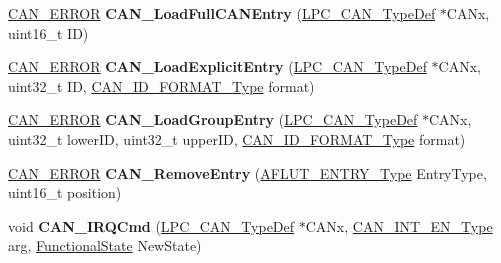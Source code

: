 \begin{DoxyCompactItemize}
\item 
\hypertarget{group___c_a_n___public___functions_ga422879f8fdbdff54c6390113b9240ee1}{\hyperlink{group___c_a_n___public___types_ga1d9859e6b360c9448574f86ea199a112}{\-C\-A\-N\-\_\-\-E\-R\-R\-O\-R} {\bfseries \-C\-A\-N\-\_\-\-Load\-Full\-C\-A\-N\-Entry} (\hyperlink{struct_l_p_c___c_a_n___type_def}{\-L\-P\-C\-\_\-\-C\-A\-N\-\_\-\-Type\-Def} $\ast$\-C\-A\-Nx, uint16\-\_\-t \-I\-D)}\label{group___c_a_n___public___functions_ga422879f8fdbdff54c6390113b9240ee1}

\item 
\hypertarget{group___c_a_n___public___functions_ga28d5776e8f957ae870f2d931d8ca555a}{\hyperlink{group___c_a_n___public___types_ga1d9859e6b360c9448574f86ea199a112}{\-C\-A\-N\-\_\-\-E\-R\-R\-O\-R} {\bfseries \-C\-A\-N\-\_\-\-Load\-Explicit\-Entry} (\hyperlink{struct_l_p_c___c_a_n___type_def}{\-L\-P\-C\-\_\-\-C\-A\-N\-\_\-\-Type\-Def} $\ast$\-C\-A\-Nx, uint32\-\_\-t \-I\-D, \hyperlink{group___c_a_n___public___types_gab5c597672ab7b26c153bcaeda4828e37}{\-C\-A\-N\-\_\-\-I\-D\-\_\-\-F\-O\-R\-M\-A\-T\-\_\-\-Type} format)}\label{group___c_a_n___public___functions_ga28d5776e8f957ae870f2d931d8ca555a}

\item 
\hypertarget{group___c_a_n___public___functions_ga57300f66dcb77df497d66f09be208530}{\hyperlink{group___c_a_n___public___types_ga1d9859e6b360c9448574f86ea199a112}{\-C\-A\-N\-\_\-\-E\-R\-R\-O\-R} {\bfseries \-C\-A\-N\-\_\-\-Load\-Group\-Entry} (\hyperlink{struct_l_p_c___c_a_n___type_def}{\-L\-P\-C\-\_\-\-C\-A\-N\-\_\-\-Type\-Def} $\ast$\-C\-A\-Nx, uint32\-\_\-t lower\-I\-D, uint32\-\_\-t upper\-I\-D, \hyperlink{group___c_a_n___public___types_gab5c597672ab7b26c153bcaeda4828e37}{\-C\-A\-N\-\_\-\-I\-D\-\_\-\-F\-O\-R\-M\-A\-T\-\_\-\-Type} format)}\label{group___c_a_n___public___functions_ga57300f66dcb77df497d66f09be208530}

\item 
\hypertarget{group___c_a_n___public___functions_gaef02b93137c82e7123eb6a7324fff611}{\hyperlink{group___c_a_n___public___types_ga1d9859e6b360c9448574f86ea199a112}{\-C\-A\-N\-\_\-\-E\-R\-R\-O\-R} {\bfseries \-C\-A\-N\-\_\-\-Remove\-Entry} (\hyperlink{group___c_a_n___public___types_gadf681942f2c313b94d483bf0f31f7a55}{\-A\-F\-L\-U\-T\-\_\-\-E\-N\-T\-R\-Y\-\_\-\-Type} \-Entry\-Type, uint16\-\_\-t position)}\label{group___c_a_n___public___functions_gaef02b93137c82e7123eb6a7324fff611}

\item 
\hypertarget{group___c_a_n___public___functions_ga0d0e0f7d8ea71a138fb100f2efdcaf1e}{void {\bfseries \-C\-A\-N\-\_\-\-I\-R\-Q\-Cmd} (\hyperlink{struct_l_p_c___c_a_n___type_def}{\-L\-P\-C\-\_\-\-C\-A\-N\-\_\-\-Type\-Def} $\ast$\-C\-A\-Nx, \hyperlink{group___c_a_n___public___types_gac1a14bd07dce4fe9df7c9d30f0449df0}{\-C\-A\-N\-\_\-\-I\-N\-T\-\_\-\-E\-N\-\_\-\-Type} arg, \hyperlink{group___l_p_c___types___public___types_gac9a7e9a35d2513ec15c3b537aaa4fba1}{\-Functional\-State} \-New\-State)}\label{group___c_a_n___public___functions_ga0d0e0f7d8ea71a138fb100f2efdcaf1e}


\end{DoxyCompactItemize}
